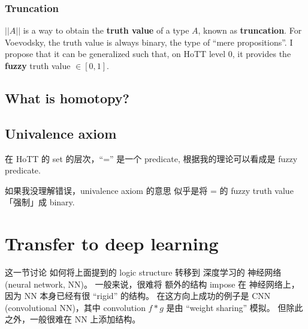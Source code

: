 \subsubsection{Truncation}

$||A||$ is a way to obtain the \textbf{truth value} of a type $A$, known as \textbf{truncation}.  For Voevodsky, the truth value is always binary, the type of ``mere propositions''.  I propose that it can be generalized such that, on HoTT level 0, it provides the \textbf{fuzzy} truth value $\in [0,1]$.

\subsection{What is homotopy?}

\subsection{Univalence axiom}

在 HoTT 的 set 的层次，``='' 是一个 predicate, 根据我的理论可以看成是 fuzzy predicate.

如果我没理解错误，univalence axiom 的意思 似乎是将 = 的 fuzzy truth value「强制」成 binary.

\section{Transfer to deep learning}

这一节讨论 如何将上面提到的 logic structure 转移到 深度学习的 神经网络 (neural network, NN)。  一般来说，很难将 额外的结构 impose 在 神经网络上，因为 NN 本身已经有很 ``rigid'' 的结构。 在这方向上成功的例子是 CNN (convolutional NN)，其中 convolution $f * g$ 是由 ``weight sharing'' 模拟。 但除此之外，一般很难在 NN 上添加结构。

